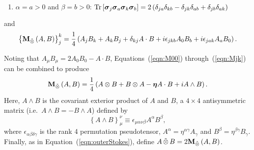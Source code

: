 \documentclass[twocolumn]{aastex6}
\newcommand{\mbf}[1]{\mbox{\boldmath $#1$}}
\newcommand{\Eqn}[1]{Equation~(\ref{eqn:#1})}
\newcommand{\Eqns}[3]{Equations~(\ref{eqn:#1}) #2~(\ref{eqn:#3})}
\newcommand{\irow}{\mu} \newcommand{\icol}{\nu}
\newcommand{\srow}{j} \newcommand{\scol}{k}
\newcommand{\trace}{{\rm Tr}}
\newcommand{\real}{{\rm Re}}
\newcommand{\tr}[1]{\trace\ensuremath{ \left[ {#1} \right] }}
\newcommand{\re}[1]{\real\ensuremath{ \left[ {#1} \right] }}
\newcommand{\Linner}[2]{\ensuremath{ { {#1} \cdot {#2} } } }
\newcommand{\bilinear}[2]{\ensuremath{\left({#1},{#2}\right)}}
\newcommand{\stimes}{\ensuremath{\tilde{\otimes}}}
\newcommand{\spinorBilinear}[2]{\ensuremath{{#1}\,\stimes\,{#2}}}
\newcommand{\spinorMueller}[2]{\ensuremath{{\bf M}_{\stimes}\bilinear{#1}{#2}}}
\newcommand{\exterior}[2]{\ensuremath{{#1}\wedge{#2}}}
\newcommand{\pauli}[1]{\ensuremath{\mbf{\sigma}_{#1}}}
\begin{document}
{\begin{appendix}
\begin{enumerate}
\begin{enumerate}
\item $\alpha=a>0$ and $\beta=b>0$: $\tr{\pauli{\srow}\pauli{a}\pauli{\scol}\pauli{b}}
= 2\left( \delta_{\srow a}\delta_{\scol b} - \delta_{\srow\scol}\delta_{ab} + \delta_{\srow b}\delta_{a\scol} \right)$
\end{enumerate}
and
\begin{equation}
\label{eqn:Mjk}
\left\{\spinorMueller{A}{B}\right\}_\srow^\scol = \frac{1}{4} \left( 
  A_\srow B_\scol + A_\scol B_\srow + \delta_{\scol\srow} A \cdot B
+ i\epsilon_{\srow\scol b}A_0B_b
+ i\epsilon_{\srow a\scol}A_aB_0 \right).
\end{equation}
\end{enumerate}
%
Noting that $A_\irow B_\irow = 2A_0 B_0 - A \cdot B$,
%
\Eqns{M00}{through}{Mjk} can be combined to produce
%
\begin{equation}
\spinorMueller{A}{B} = \frac{1}{4} 
 \left( A \otimes B + B \otimes A
 - {\mbf\eta}\Linner{A}{B} + i A \wedge B \right).
\label{eqn:appSpinorMueller}
\end{equation}
%
Here, $A \wedge B$ is the covariant exterior product of $A$ and $B$, a
$4\times4$ antisymmetric matrix
(i.e.\ $\exterior{A}{B}=-\exterior{B}{A}$) defined by
%
\begin{equation}
\left\{A \wedge B\right\}_\irow^\icol
\equiv \epsilon_{\irow\alpha\icol\beta} A^\alpha B^\beta,
\label{eqn:exterior}
\end{equation}
%
where $\epsilon_{\alpha\beta\delta\gamma}$ is the rank 4 permutation
pseudotensor, $A^\alpha=\eta^{\alpha\gamma}A_\gamma$ and
$B^\beta=\eta^{\beta\gamma}B_\gamma$.
%
Finally, as in \Eqn{outerStokes}, define
$\spinorBilinear{A}{B}=2\spinorMueller{A}{B}$.



\end{appendix}}
\end{document}
